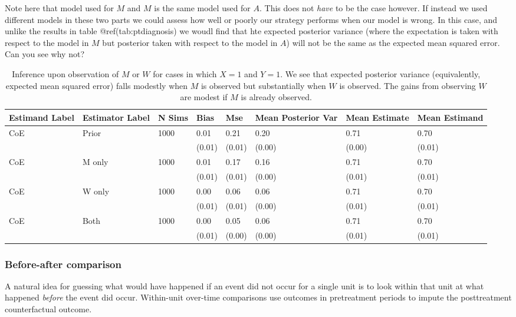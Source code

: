 \documentclass[
]{article}
\begin{document}
Note here that model used for \(M\) and \(M\) is the same model used for
\(A\). This does not \emph{have} to be the case however. If instead we
used different models in these two parts we could assess how well or
poorly our strategy performs when our model is wrong. In this case, and
unlike the results in table @ref(tab:ptdiagnosis) we woudl find that hte
expected posterior variance (where the expectation is taken with respect
to the model in \(M\) but posterior taken with respect to the model in
\(A\)) will not be the same as the expected mean squared error. Can you
see why not?

\begin{table}

\caption{\label{tab:ptdiagnosis}Inference upon observation of $M$ or $W$ for cases in which $X = 1$ and $Y = 1$. We see that expected posterior variance (equivalently, expected mean squared error) falls modestly when $M$ is observed but substantially when $W$ is observed. The gains from observing $W$ are modest if $M$ is already observed.}
\centering
\begin{tabular}[t]{l|l|l|l|l|l|l|l}
\hline
Estimand Label & Estimator Label & N Sims & Bias & Mse & Mean Posterior Var & Mean Estimate & Mean Estimand\\
\hline
CoE & Prior & 1000 & 0.01 & 0.21 & 0.20 & 0.71 & 0.70\\
\hline
 &  &  & (0.01) & (0.01) & (0.00) & (0.00) & (0.01)\\
\hline
CoE & M only & 1000 & 0.01 & 0.17 & 0.16 & 0.71 & 0.70\\
\hline
 &  &  & (0.01) & (0.01) & (0.00) & (0.01) & (0.01)\\
\hline
CoE & W only & 1000 & 0.00 & 0.06 & 0.06 & 0.71 & 0.70\\
\hline
 &  &  & (0.01) & (0.01) & (0.00) & (0.01) & (0.01)\\
\hline
CoE & Both & 1000 & 0.00 & 0.05 & 0.06 & 0.71 & 0.70\\
\hline
 &  &  & (0.01) & (0.00) & (0.00) & (0.01) & (0.01)\\
\hline
\end{tabular}
\end{table}

\hypertarget{before-after-comparison}{%
\subsubsection{Before-after comparison}\label{before-after-comparison}}

A natural idea for guessing what would have happened if an event did not
occur for a single unit is to look within that unit at what happened
\emph{before} the event did occur. Within-unit over-time comparisons use
outcomes in pretreatment periods to impute the posttreatment
counterfactual outcome.
\end{document}
